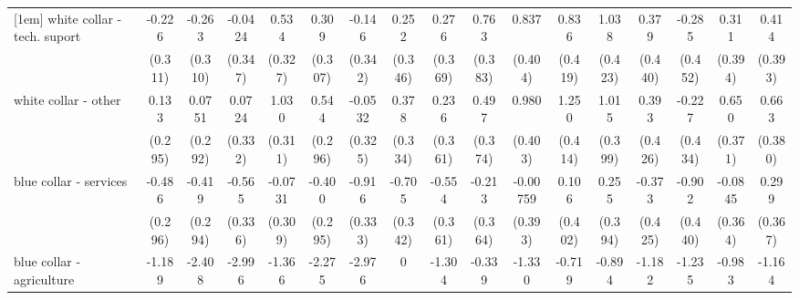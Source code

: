 {\begin{tabular}{l*{16}{c}}
[1em]
white collar - tech. suport&      -0.226         &      -0.263         &     -0.0424         &       0.534         &       0.309         &      -0.146         &       0.252         &       0.276         &       0.763\sym{*}  &       0.837\sym{*}  &       0.836\sym{*}  &       1.038\sym{*}  &       0.379         &      -0.285         &       0.311         &       0.414         \\
                    &     (0.311)         &     (0.310)         &     (0.347)         &     (0.327)         &     (0.307)         &     (0.342)         &     (0.346)         &     (0.369)         &     (0.383)         &     (0.404)         &     (0.419)         &     (0.423)         &     (0.440)         &     (0.452)         &     (0.394)         &     (0.393)         \\
[1em]
white collar - other&       0.133         &      0.0751         &      0.0724         &       1.030\sym{***}&       0.544         &     -0.0532         &       0.378         &       0.236         &       0.497         &       0.980\sym{*}  &       1.250\sym{**} &       1.015\sym{*}  &       0.393         &      -0.227         &       0.650         &       0.663         \\
                    &     (0.295)         &     (0.292)         &     (0.332)         &     (0.311)         &     (0.296)         &     (0.325)         &     (0.334)         &     (0.361)         &     (0.374)         &     (0.403)         &     (0.414)         &     (0.399)         &     (0.426)         &     (0.434)         &     (0.371)         &     (0.380)         \\
[1em]
blue collar - services&      -0.486         &      -0.419         &      -0.565         &     -0.0731         &      -0.400         &      -0.916\sym{**} &      -0.705\sym{*}  &      -0.554         &      -0.213         &    -0.00759         &       0.106         &       0.255         &      -0.373         &      -0.902\sym{*}  &     -0.0845         &       0.299         \\
                    &     (0.296)         &     (0.294)         &     (0.336)         &     (0.309)         &     (0.295)         &     (0.333)         &     (0.342)         &     (0.361)         &     (0.364)         &     (0.393)         &     (0.402)         &     (0.394)         &     (0.425)         &     (0.440)         &     (0.364)         &     (0.367)         \\
[1em]
blue collar - agriculture&      -1.189         &      -2.408\sym{**} &      -2.996\sym{**} &      -1.366         &      -2.275\sym{*}  &      -2.976\sym{**} &           0         &      -1.304         &      -0.339         &      -1.330         &      -0.719         &      -0.894         &      -1.182         &      -1.235         &      -0.983         &      -1.164         \\

\end{tabular}}
